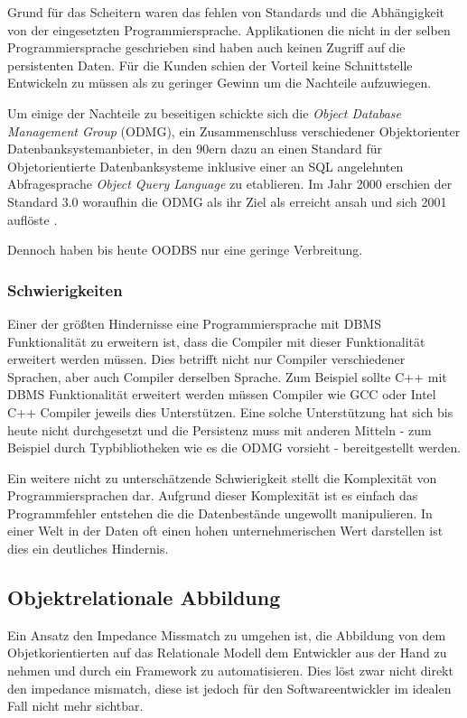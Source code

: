 
Grund für das Scheitern waren das fehlen von Standards und die Abhängigkeit von der eingesetzten Programmiersprache. Applikationen die nicht in der selben Programmiersprache geschrieben sind haben auch keinen Zugriff auf die persistenten Daten. Für die Kunden schien der Vorteil keine Schnittstelle Entwickeln zu müssen als zu geringer Gewinn \cite{stonebraker} um die Nachteile aufzuwiegen.

Um einige der Nachteile zu beseitigen schickte sich die \emph{Object Database Management Group} (ODMG), ein Zusammenschluss verschiedener Objektorienter Datenbanksystemanbieter, in den 90ern dazu an einen Standard für Objetorientierte Datenbanksysteme inklusive einer an SQL angelehnten Abfragesprache \emph{Object Query Language} zu etablieren. Im Jahr 2000 erschien der Standard 3.0 woraufhin die ODMG als ihr Ziel als erreicht ansah und sich 2001 auflöste \cite{http://www.odbms.org/odmg-standard/}.

Dennoch haben bis heute OODBS nur eine geringe Verbreitung.


\subsubsection{Schwierigkeiten}
Einer der größten Hindernisse eine Programmiersprache mit DBMS Funktionalität zu erweitern ist, dass die Compiler mit dieser Funktionalität erweitert werden müssen. Dies betrifft nicht nur Compiler verschiedener Sprachen, aber auch Compiler derselben Sprache. Zum Beispiel sollte C++ mit DBMS Funktionalität erweitert werden müssen Compiler wie GCC oder Intel C++ Compiler jeweils dies Unterstützen. Eine solche Unterstützung hat sich bis heute nicht durchgesetzt und die Persistenz muss mit anderen Mitteln - zum Beispiel durch Typbibliotheken wie es die ODMG vorsieht - bereitgestellt werden.

Ein weitere nicht zu unterschätzende Schwierigkeit stellt die Komplexität von Programmiersprachen dar. Aufgrund dieser Komplexität ist es einfach das Programmfehler entstehen die die Datenbestände ungewollt manipulieren. In einer Welt in der Daten oft einen hohen unternehmerischen Wert darstellen ist dies ein deutliches Hindernis. 


\subsection{Objektrelationale Abbildung}
Ein Ansatz den Impedance Missmatch zu umgehen ist, die Abbildung von dem Objetkorientierten auf das Relationale Modell dem Entwickler aus der Hand zu nehmen und durch ein Framework zu automatisieren. Dies löst zwar nicht direkt den impedance mismatch, diese ist jedoch für den Softwareentwickler im idealen Fall nicht mehr sichtbar.

